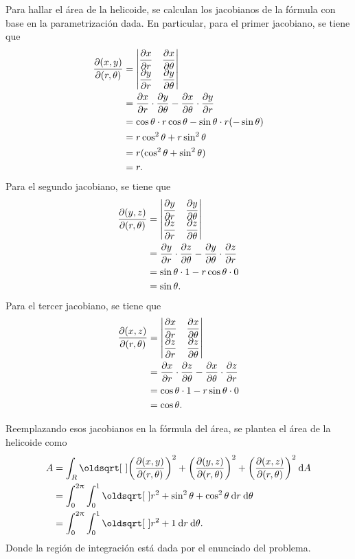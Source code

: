 \documentclass{fmbvecto}
\begin{document}
\begin{problema}
Para hallar el área de la helicoide, se calculan los jacobianos de la fórmula con base en la parametrización dada. En particular, para el primer jacobiano, se tiene que
\begin{align*}
    \parder[(x, y)][(r, \theta)] &= \begin{vmatrix}
        \dparder[x][r] & \dparder[x][\theta] \\
        \dparder[y][r] & \dparder[y][\theta]
    \end{vmatrix} \\
    &= \parder[x][r] \cdot \parder[y][\theta] - \parder[x][\theta] \cdot \parder[y][r] \\
    &= \cos\theta \cdot r\cos\theta - \sin\theta \cdot r(-\sin\theta)\\
    &= r\cos^2\theta + r\sin^2\theta \\
    &= r ( \cos^2\theta + \sin^2\theta ) \\
    &= r.
\end{align*}
Para el segundo jacobiano, se tiene que
\begin{align*}
    \parder[(y, z)][(r, \theta)] &= \begin{vmatrix}
        \dparder[y][r] & \dparder[y][\theta] \\
        \dparder[z][r] & \dparder[z][\theta]
    \end{vmatrix} \\
    &= \parder[y][r] \cdot \parder[z][\theta] - \parder[y][\theta] \cdot \parder[z][r] \\
    &= \sin\theta \cdot 1 - r\cos\theta \cdot 0 \\
    &= \sin\theta.
\end{align*}
Para el tercer jacobiano, se tiene que
\begin{align*}
    \parder[(x, z)][(r, \theta)] &= \begin{vmatrix}
        \dparder[x][r] & \dparder[x][\theta] \\
        \dparder[z][r] & \dparder[z][\theta]
    \end{vmatrix} \\
    &= \parder[x][r] \cdot \parder[z][\theta] - \parder[x][\theta] \cdot \parder[z][r] \\
    &= \cos\theta \cdot 1 - r\sin\theta \cdot 0 \\
    &= \cos\theta.
\end{align*}

Reemplazando esos jacobianos en la fórmula del área, se plantea el área de la helicoide como
\begin{align*}
    A &= \int_{R} \sqrt{\left(\parder[(x, y)][(r, \theta)]\right)^2 + \left(\parder[(y, z)][(r, \theta)]\right)^2 + \left(\parder[(x, z)][(r, \theta)]\right)^2} \: \mathrm{d}A \\
    &= \int_{0}^{2\uppi} \int_{0}^{1} \sqrt{r^2 + \sin^2\theta + \cos^2\theta} \: \mathrm{d}r \: \mathrm{d}\theta \\
    &= \int_{0}^{2\uppi} \int_{0}^{1} \sqrt{r^2 + 1} \: \mathrm{d}r \: \mathrm{d}\theta.
\end{align*}
Donde la región de integración está dada por el enunciado del problema. \\


\end{problema}
\end{document}
